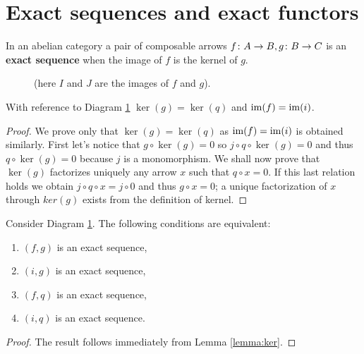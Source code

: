 \newpage
\section{Exact sequences and exact functors}
\label{sec:exact}
\begin{definition}
  \label{def:exact_sequence}
  In an abelian category a pair of composable arrows \(f\colon A\to B,g\colon B\to C\) is an {\bf exact sequence} when the image of \(f\) is the kernel of \(g\).
\end{definition}

\begin{figure}[h]
  
  \caption{(here \(I\) and \(J\) are the images of \(f\) and \(g\)).}
  \label{diagram:exact_sequence}
\end{figure}

\begin{lemma}
  \label{lemma:ker}
  With reference to Diagram \ref{diagram:exact_sequence} \(\ker(g) = \ker(q)\) and \(\operatorname{im}(f) = \operatorname{im}(i)\).
\end{lemma}

\begin{proof}
  We prove only that \(\ker(g) = \ker(q)\) as \(\operatorname{im}(f) = \operatorname{im}(i)\) is obtained similarly. First let's notice that \(g\circ\ker(g) = 0\) so \(j\circ q\circ\ker(g) = 0\) and thus \(q\circ\ker(g) = 0\) because \(j\) is a monomorphism. We shall now prove that \(\ker(g)\) factorizes uniquely any arrow \(x\) such that \(q\circ x = 0\). If this last relation holds we obtain \(j\circ q\circ x = j\circ 0\) and thus \(g\circ x = 0\); a unique factorization of \(x\) through \(ker(g)\) exists from the definition of kernel.
\end{proof}

\begin{proposition}
  \label{prop:characterization_of_exact_sequences}
  Consider Diagram \ref{diagram:exact_sequence}. The following conditions are equivalent:
  \begin{enumerate}[label=(\arabic*)]
  \item \((f, g)\) is an exact sequence,
  \item \((i, g)\) is an exact sequence,
  \item \((f, q)\) is an exact sequence,
  \item \((i, q)\) is an exact sequence.
  \end{enumerate}
\end{proposition}

\begin{proof}
  The result follows immediately from Lemma \ref{lemma:ker}.
\end{proof}

